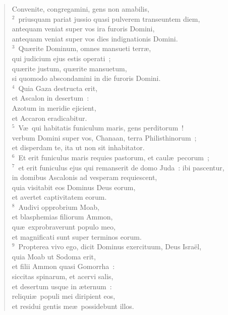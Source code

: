 \begin{flushleft}\begin{verse}\vspace{-19pt}Convenite, congregamini, gens non amabilis,\\
${}^{2}$~priusquam pariat jussio quasi pulverem transeuntem diem,\\ antequam veniat super vos ira furoris Domini,\\ antequam veniat super vos dies indignationis Domini.\\
${}^{3}$~Qu\ae rite Dominum, omnes mansueti terr\ae ,\\ qui judicium ejus estis operati~;\\ qu\ae rite justum, qu\ae rite mansuetum,\\ si quomodo abscondamini in die furoris Domini.\\
${}^{4}$~Quia Gaza destructa erit,\\ et Ascalon in desertum~:\\ Azotum in meridie ejicient,\\ et Accaron eradicabitur.\\
${}^{5}$~V\ae\ qui habitatis funiculum maris, gens perditorum~!\\ verbum Domini super vos, Chanaan, terra Philisthinorum~;\\ et disperdam te, ita ut non sit inhabitator.\\
${}^{6}$~Et erit funiculus maris requies pastorum, et caul\ae\ pecorum~;\\
${}^{7}$~et erit funiculus ejus qui remanserit de domo Juda~: ibi pascentur,\\ in domibus Ascalonis ad vesperam requiescent,\\ quia visitabit eos Dominus Deus eorum,\\ et avertet captivitatem eorum.\\
${}^{8}$~Audivi opprobrium Moab,\\ et blasphemias filiorum Ammon,\\ qu\ae\ exprobraverunt populo meo,\\ et magnificati sunt super terminos eorum.\\
${}^{9}$~Propterea vivo ego, dicit Dominus exercituum, Deus Isra\"el,\\ quia Moab ut Sodoma erit,\\ et filii Ammon quasi Gomorrha~:\\ siccitas spinarum, et acervi salis,\\ et desertum usque in \ae ternum~:\\ reliqui\ae\ populi mei diripient eos,\\ et residui gentis me\ae\ possidebunt illos.\\

\end{verse}
\end{flushleft}
